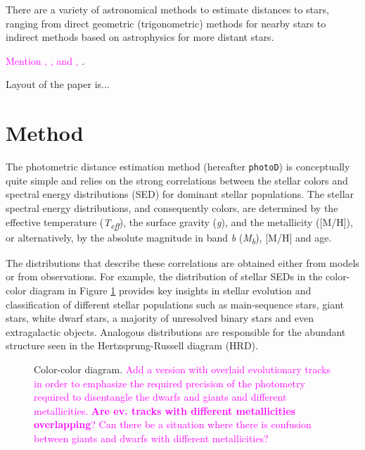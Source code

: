 \documentclass[linenumbers, twocolumn, trackchanges]{aastex631}
\newcommand{\magcom}[1]{\textcolor{magenta}{#1}} %
\newcommand{\pd}{\texttt{photoD}}
\begin{document}
There are a variety of astronomical methods to estimate distances to stars, ranging from direct geometric (trigonometric) methods for nearby stars to indirect methods based on astrophysics for more distant stars. 

\magcom{Mention \citet{bailer-jones_estimating_2021}, \cite{green_measuring_2014,green_three-dimensional_2015,green_3d_2019}, \citet{juric_milky_2008} and \citet{lallement_3d_2014}, \citet{queiroz_starhorse_2018}}.

Layout of the paper is...

\section{Method} \label{sec:method}

The photometric distance estimation method (hereafter \pd) is conceptually quite simple and relies on the strong correlations between the stellar colors and spectral energy distributions (SED) for dominant stellar populations. The stellar spectral energy distributions, and consequently colors, are determined by the effective temperature (\textit{T\textsubscript{eff}}), the surface gravity (\textit{g}), and the metallicity ([M/H]), or alternatively, by the absolute magnitude in band \textit{b} (\textit{M\textsubscript{b}}), [M/H] and age.

The distributions that describe these correlations are obtained either from models or from observations. For example, the distribution of stellar SEDs in the color-color diagram in Figure \ref{fig:2c_example} provides key insights in stellar evolution and classification of different stellar populations such as main-sequence stars, giant stars, white dwarf stars, a majority of unresolved binary stars and even extragalactic objects. Analogous distributions are responsible for the abundant structure seen in the Hertzsprung-Russell diagram (HRD).

\begin{figure}[ht!]
	\caption{Color-color diagram. \magcom{Add a version with overlaid evolutionary tracks in order to emphasize the required precision of the photometry required to disentangle the dwarfs and giants and different metallicities. \textbf{Are ev. tracks with different metallicities overlapping}? Can there be a situation where there is confusion between giants and dwarfs with different metallicities?} \label{fig:2c_example}}
\end{figure}
\end{document}
